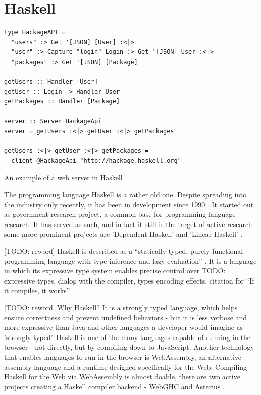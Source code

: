 \documentclass[english,odsaz]{fitthesis}
\begin{document}
\section{Haskell}
\label{sec:org7c33a66}
\begin{listing}[htbp]
\begin{verbatim}
type HackageAPI =
  "users" :> Get '[JSON] [User] :<|>
  "user" :> Capture "login" Login :> Get '[JSON] User :<|>
  "packages" :> Get '[JSON] [Package]

getUsers :: Handler [User]
getUser :: Login -> Handler User
getPackages :: Handler [Package]

server :: Server HackageApi
server = getUsers :<|> getUser :<|> getPackages

getUsers :<|> getUser :<|> getPackages =
  client @HackageApi "http://hackage.haskell.org"
\end{verbatim}
\caption{An example of a web server in Haskell}
\end{listing}

The programming language Haskell is a rather old one. Despite spreading into the
industry only recently, it has been in development since 1990
\cite{haskell_history}. It started out as government research project, a common
base for programming language research. It has served as such, and in fact it
still is the target of active research - some more prominent projects are
'Dependent Haskell' \cite{eisenberg2016dependent} and 'Linear Haskell'
\cite{bernardy2017linear}.

[TODO: reword] Haskell is described as a ``statically typed, purely functional
programming language with type inference and lazy evaluation''
\cite{jones2003haskell}. It is a language in which its expressive type system
enables precise control over TODO: expressive types, dialog with the compiler,
types encoding effects, citation for ``If it compiles, it works''.

[TODO: reword] Why Haskell? It is a strongly typed language, which helps ensure
correctness and prevent undefined behaviors - but it is less verbose and more
expressive than Java and other languages a developer would imagine as 'strongly
typed'. Haskell is one of the many languages capable of running in the browser -
not directly, but by compiling down to JavaScript. Another technology that
enables languages to run in the browser is WebAssembly, an alternative assembly
language and a runtime designed specifically for the Web. Compiling Haskell for
the Web via WebAssembly is almost doable, there are two active projects creating
a Haskell compiler backend - WebGHC \cite{webghc} and Asterius \cite{asterius}.
\end{document}
